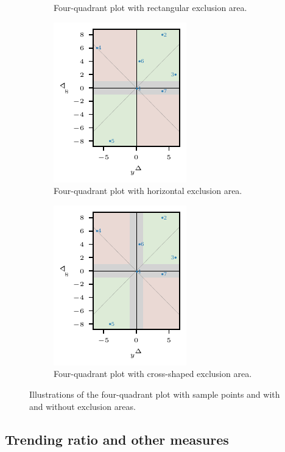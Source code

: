 \begin{figure}
\begin{subfigure}[t]{.24\textwidth}
\caption{Four-quadrant plot with rectangular exclusion area.}\label{fig:trending_basic_4q_excl_box}
\end{subfigure}\hspace{0.01\textwidth}%
\begin{subfigure}[t]{.24\textwidth}
\includegraphics{plots/illustrative_examples/4q_excl_axis}
\caption{Four-quadrant plot with horizontal exclusion area.} \label{fig:trending_basic_4q_excl_axis}
\end{subfigure}\hspace{0.01\textwidth}%
\begin{subfigure}[t]{.24\textwidth}
\includegraphics{plots/illustrative_examples/4q_excl_cross}
\caption{Four-quadrant plot with cross-shaped exclusion area.}\label{fig:trending_basic_4q_excl_cross}
\end{subfigure}%
\caption{Illustrations of the four-quadrant plot with sample points and with and without exclusion areas. }
\label{fig:trending_4q}
\end{figure}

\subsection{Trending ratio and other measures}\label{subsec:trending-measures}

